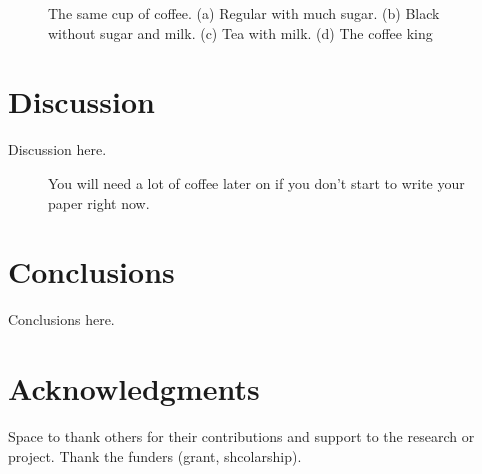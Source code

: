 \documentclass [11pt, twocolumn] {article}
\begin{document}
\begin{figure}
	\centering
	\begin{subfigure}[b]{0.2\linewidth}
		\caption{}
		\label{fig:coffee1}
	\end{subfigure}
	\begin{subfigure}[b]{0.2\linewidth}
		\caption{}
		\label{fig:coffee2}
	\end{subfigure}
	\begin{subfigure}[b]{0.2\linewidth}
		\caption{}
		\label{fig:coffee3}
	\end{subfigure}
	\begin{subfigure}[b]{0.5\linewidth}
		\caption{}
		\label{fig:coffee4}
	\end{subfigure}
	\caption{The same cup of coffee. (a) Regular with much sugar. (b) Black without sugar and milk. (c) Tea with milk. (d) The coffee king}
	\label{fig:coffee}
\end{figure}



\section{Discussion}
Discussion here. \blindtext

\begin{figure}
	\centering
	\caption{You will need a lot of coffee later on if you don't start to write your paper right now.}
	\label{fig:trap}
\end{figure}


\section{Conclusions}
Conclusions here.

\section{Acknowledgments}
Space to thank others for their contributions and support to the research or project. Thank the funders (grant, shcolarship).
\end{document}
